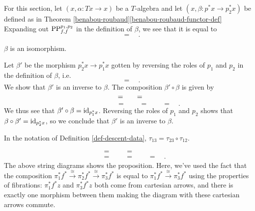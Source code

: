 \documentclass{amsart}
\begin{document}
    For this section, let $(x,\alpha:Tx\to x)$ 
        be a $T$-algebra and let $(x,\beta:p^\ast x\to p_2^\ast x)$
        be defined as in Theorem \ref{benabou-roubaud}\eqref{benabou-roubaud-functor-def}
    Expanding out $\operatorname{PP}^{p_1,p_2}_{f,f}$ in the definition of 
        $\beta$, we see that it is equal to
    \[
        
        \quad=\quad
        
        .
    \]
\begin{proposition}
    $\beta$ is an isomorphism.
\end{proposition}
    Let $\beta'$ be the morphism $p_2^\ast x\to p_1^\ast x$ gotten by reversing the roles
        of $p_1$ and $p_2$ in the definition of $\beta$, i.e.
    \[
        
        \quad = \quad
        
        .
    \]
    We show that $\beta'$ is an inverse to $\beta$.
    The composition $\beta'\circ \beta$ is given by
    \[
        
        \quad = \quad
        
        \quad = \quad
         \\
    \]
    \[
        \qquad\qquad\qquad=\quad
        
        \quad=\quad
        
        \quad=\quad
        
        .
    \]
    We thus see that $\beta'\circ \beta=\operatorname{id}_{p_1^\ast x}$.
    Reversing the roles of $p_1$ and $p_2$ shows that $\beta\circ \beta'=\operatorname{id}_{p_2^\ast x}$,
        so we conclude that $\beta'$ is an inverse to $\beta$.
\begin{proposition}
    In the notation of Definition \ref{def-descent-data},
        $\tau_{13}=\tau_{23}\circ \tau_{12}$.
\end{proposition}
    \begin{align*}
        
        \quad &= \quad
        
        \quad = \quad
         \\
        &=\quad
        
        \quad=\quad
        
        \quad=\quad
        
        .
    \end{align*}
    The above string diagrams shows the proposition.
    Here, we've used the fact that 
        the composition $\pi_1^\ast f^\ast\xrightarrow{\cong}\pi_2^\ast f^\ast
        \xrightarrow{\cong} \pi_3^\ast f^\ast$
        is equal to $\pi_1^\ast f^\ast\xrightarrow{\cong} \pi_3^\ast f^\ast$
        using the properties of fibrations: 
        $\pi_1^\ast f^\ast z$ and $\pi_3^\ast f^\ast z$ both come from cartesian arrows,
        and there is exactly one morphism between them making the 
        diagram with these cartesian arrows commute.
\end{document}

